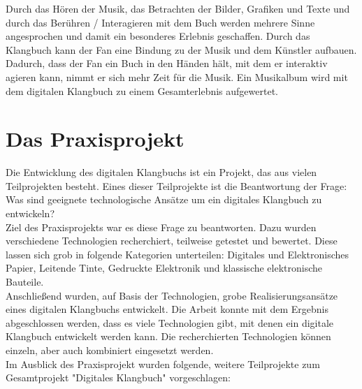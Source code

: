 Durch das Hören der Musik, das Betrachten der Bilder, Grafiken und Texte und durch das Berühren / Interagieren mit dem Buch werden mehrere Sinne angesprochen und damit ein besonderes Erlebnis geschaffen. Durch das Klangbuch kann der Fan eine Bindung zu der Musik und dem Künstler aufbauen. Dadurch, dass der Fan ein Buch in den Händen hält, mit dem er interaktiv agieren kann, nimmt er sich mehr Zeit für die Musik. Ein Musikalbum wird mit dem digitalen Klangbuch zu einem Gesamterlebnis aufgewertet.



\section{Das Praxisprojekt}
Die Entwicklung des digitalen Klangbuchs ist ein Projekt, das aus vielen Teilprojekten besteht. Eines dieser Teilprojekte ist die Beantwortung der Frage: Was sind geeignete technologische Ansätze um ein digitales Klangbuch zu entwickeln?\\ 
Ziel des Praxisprojekts war es diese Frage zu beantworten. Dazu wurden verschiedene Technologien recherchiert, teilweise getestet und bewertet. Diese lassen sich grob in folgende Kategorien unterteilen: Digitales und Elektronisches Papier, Leitende Tinte, Gedruckte Elektronik und klassische elektronische Bauteile.\\
Anschließend wurden, auf Basis der Technologien, grobe Realisierungsansätze eines digitalen Klangbuchs entwickelt. 
Die Arbeit konnte mit dem Ergebnis abgeschlossen werden, dass es viele Technologien gibt, mit denen ein digitale Klangbuch entwickelt werden kann. Die recherchierten Technologien können einzeln, aber auch kombiniert eingesetzt werden.\\
Im Ausblick des Praxisprojekt wurden folgende, weitere Teilprojekte zum Gesamtprojekt "Digitales Klangbuch" vorgeschlagen:

